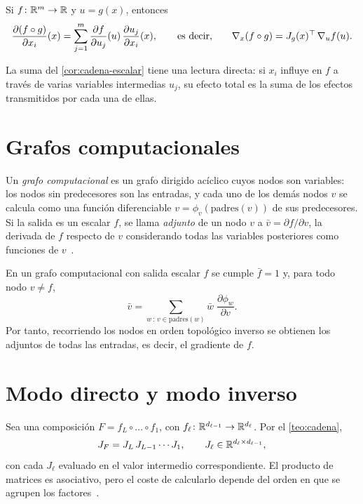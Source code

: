\begin{corolario}\label{cor:cadena-escalar}
Si $f\colon\mathbb{R}^{m}\to\mathbb{R}$ y $u=g(x)$, entonces
\[
\frac{\partial (f\circ g)}{\partial x_i}(x)=\sum_{j=1}^{m}\frac{\partial f}{\partial u_j}(u)\,\frac{\partial u_j}{\partial x_i}(x),
\qquad\text{es decir,}\qquad
\nabla_x (f\circ g)=J_g(x)^{\top}\,\nabla_u f(u).
\]
\end{corolario}

La suma del \cref{cor:cadena-escalar} tiene una lectura directa: si $x_i$ influye en $f$ a través de varias variables intermedias $u_j$, su efecto total es la suma de los efectos transmitidos por cada una de ellas.

\addtocounter{definicion}{1}%

\section{Grafos computacionales}

\begin{definicion}\label{def:grafo}
Un \emph{grafo computacional} es un grafo dirigido acíclico cuyos nodos son variables: los nodos sin predecesores son las entradas, y cada uno de los demás nodos $v$ se calcula como una función diferenciable $v=\phi_v(\text{padres}(v))$ de sus predecesores. Si la salida es un escalar $f$, se llama \emph{adjunto} de un nodo $v$ a $\bar v=\partial f/\partial v$, la derivada de $f$ respecto de $v$ considerando todas las variables posteriores como funciones de $v$~\cite[§6.5.1]{gbc}.
\end{definicion}

\begin{proposicion}[Retropropagación]\label{prop:retro}
En un grafo computacional con salida escalar $f$ se cumple $\bar f=1$ y, para todo nodo $v\neq f$,
\[
\bar v=\sum_{w\,:\,v\in\text{padres}(w)}\bar w\;\frac{\partial\phi_w}{\partial v}.
\]
Por tanto, recorriendo los nodos en orden topológico inverso se obtienen los adjuntos de todas las entradas, es decir, el gradiente de $f$.
\end{proposicion}

\addtocounter{figure}{1}%

\section{Modo directo y modo inverso}

Sea una composición $F=f_L\circ\dots\circ f_1$, con $f_\ell\colon\mathbb{R}^{d_{\ell-1}}\to\mathbb{R}^{d_\ell}$. Por el \cref{teo:cadena},
\[
J_F=J_L\,J_{L-1}\cdots J_1,\qquad J_\ell\in\mathbb{R}^{d_\ell\times d_{\ell-1}},
\]
con cada $J_\ell$ evaluado en el valor intermedio correspondiente. El producto de matrices es asociativo, pero el coste de calcularlo depende del orden en que se agrupen los factores~\cite[§5.6]{mml}.

